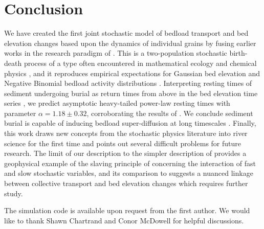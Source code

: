 \documentclass[draft]{agujournal2018}
\begin{document}
\section{Conclusion}

We have created the first joint stochastic model of bedload transport and bed elevation changes based upon the dynamics of individual grains by fusing earlier works in the research paradigm of \citet{Einstein1937}.
This is a two-population stochastic birth-death process of a type often encountered in mathematical ecology \citep[e.g.][]{Pielou1977} and chemical physics \citep[e.g.][]{Gardiner1983}, and it reproduces empirical expectations for Gaussian bed elevation and Negative Binomial bedload activity distributions \citep[e.g.][]{Wong2007,Ancey2008}.
Interpreting resting times of sediment undergoing burial as return times from above in the bed elevation time series \citep[e.g.][]{Voepel2013}, we predict asymptotic heavy-tailed power-law resting times with parameter $\alpha = 1.18 \pm 0.32$, corroborating the results of \citet{Martin2014}.
We conclude sediment burial is capable of inducing bedload super-diffusion at long timescales \citep[e.g.][]{Phillip2013}.
Finally, this work draws new concepts from the stochastic physics literature into river science for the first time and points out several difficult problems for future research.
The limit of our description to the simpler description of \citet{Martin2014} provides a geophysical example of the slaving principle of \citet{Haken1983} concerning the interaction of fast and slow stochastic variables, and its comparison to \citet{Ancey2008} suggests a nuanced linkage between collective transport and bed elevation changes which requires further study.


\acknowledgments
The simulation code is available upon request from the first author. We would like to thank Shawn Chartrand and Conor McDowell for helpful discussions. 


\end{document}
